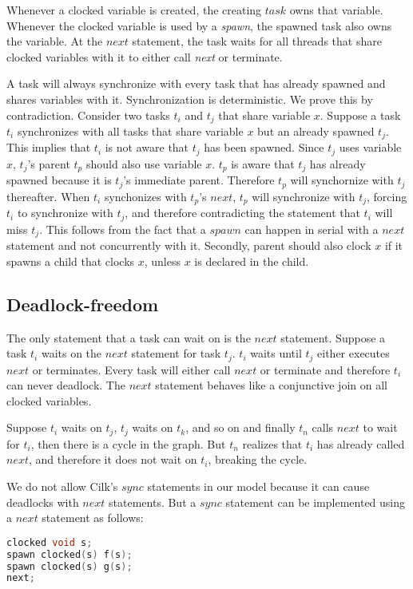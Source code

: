 \documentclass[10pt, conference, compsocconf]{IEEEtran}
\begin{document}
Whenever a clocked variable is created, the creating $task$ owns that
variable. Whenever the clocked variable is used by a \emph{spawn}, the spawned
task also owns the variable. At the $next$ statement, the task waits for all 
threads that share clocked variables with it to either call \emph{next} or terminate.

A task will always synchronize with every task that has already spawned and shares variables with it. Synchronization is deterministic.
We prove this by contradiction. Consider two tasks $t_i$ and $t_j$
that share variable $x$. Suppose a task $t_i$ synchronizes with 
all tasks that share variable $x$  but an already spawned $t_j$.
This implies that $t_i$ is not aware that $t_j$ has been spawned.
Since $t_j$ uses variable $x$, $t_j$'s parent $t_p$ should
also use variable $x$.  $t_p$ is aware that $t_j$ has already spawned because
it is $t_j$'s immediate parent. Therefore $t_p$ will synchornize with $t_j$ thereafter. 
When $t_i$ synchonizes with $t_p$'s $next$, $t_p$ will synchronize with $t_j$, 
forcing $t_i$ to synchronize with $t_j$, and therefore  contradicting the statement that $t_i$ will
miss $t_j$. This follows from the fact that a $spawn$ can happen in serial with a $next$ statement
and not concurrently with it.  Secondly, parent should also clock  $x$ if it spawns a child 
that clocks $x$, unless $x$ is declared in the child.


\subsection{Deadlock-freedom}

The only statement that a task can wait on is the $next$ statement.
Suppose a task $t_i$ waits on the $next$ statement for task $t_j$.
$t_i$ waits until $t_j$ either executes $next$ or terminates.
Every task will either call $next$ or terminate and therefore
$t_i$ can never deadlock.
The $next$ statement  behaves like a conjunctive join on 
all clocked variables.

Suppose $t_i$ waits on $t_j$, $t_j$ waits on $t_k$, and so on
and finally $t_n$ calls $next$ to wait for $t_i$, then there is a cycle in the 
graph. But $t_n$ realizes that $t_i$ has already called $next$, and therefore
it does not wait on $t_i$, breaking the cycle.  

We do not allow Cilk's $sync$ statements in our model because it can cause
deadlocks with $next$ statements.
But a $sync$ statement can be implemented using a $next$ statement as follows:
\begin{lstlisting}[language=c]
clocked void s;
spawn clocked(s) f(s);
spawn clocked(s) g(s);
next;
\end{lstlisting}
\end{document}
